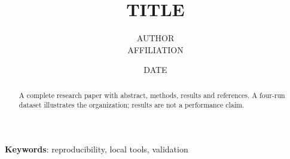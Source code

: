 \documentclass{article}
\title{{{TITLE}}}
\author{{{AUTHOR}} \\ {{AFFILIATION}}}
\date{{{DATE}}}
\begin{document}
\maketitle
\begin{abstract}A complete research paper with abstract, methods, results and references. A four-run dataset illustrates the organization; results are not a performance claim.\end{abstract}
\textbf{Keywords}: reproducibility, local tools, validation





\end{document}
